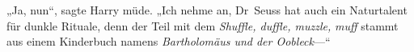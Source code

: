 „Ja, nun“, sagte Harry müde. „Ich nehme an, Dr~Seuss hat auch ein Naturtalent für dunkle Rituale, denn der Teil mit dem \emph{Shuffle, duffle, muzzle,} \emph{muff} stammt aus einem Kinderbuch namens \emph{Bartholomäus und der Oobleck}—“

